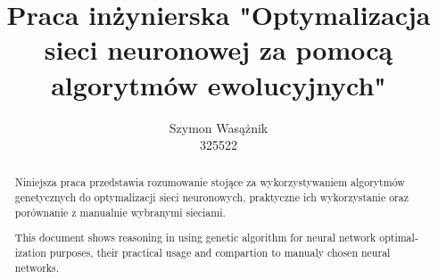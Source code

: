 \documentclass[a4paper, 12pt]{article}
\title{Praca inżynierska "Optymalizacja sieci neuronowej za pomocą algorytmów ewolucyjnych"}
\author{Szymon Wasążnik\\325522}
\begin{document}
\maketitle
\setcounter{page}{-1}
\thispagestyle{empty}
\vfil
\begin{abstract}
  \centering
  \noindent
  Niniejsza praca przedstawia rozumowanie stojące
  za wykorzystywaniem algorytmów genetycznych
  do optymalizacji sieci neuronowych, praktyczne ich wykorzystanie
  oraz porównanie z manualnie wybranymi sieciami.

  \vspace{1cm}
  \begin{otherlanguage}{english}
  \noindent
  This document shows reasoning in using genetic algorithm
  for neural network optimalization purposes, their practical usage
  and compartion to manualy chosen neural networks.
  \end{otherlanguage}
\end{abstract}
\vfil
\newpage
\thispagestyle{empty}
\tableofcontents
\newpage














\printbibliography[
  heading=bibintoc,
  title={Bibliografia}
]
\end{document}
